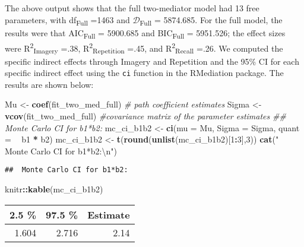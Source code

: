 \documentclass[11pt,]{article}
\newenvironment{Shaded}{\begin{snugshade}}{\end{snugshade}}
\newcommand{\CharTok}[1]{\textcolor[rgb]{0.31,0.60,0.02}{#1}}
\newcommand{\CommentTok}[1]{\textcolor[rgb]{0.56,0.35,0.01}{\textit{#1}}}
\newcommand{\DataTypeTok}[1]{\textcolor[rgb]{0.13,0.29,0.53}{#1}}
\newcommand{\DecValTok}[1]{\textcolor[rgb]{0.00,0.00,0.81}{#1}}
\newcommand{\KeywordTok}[1]{\textcolor[rgb]{0.13,0.29,0.53}{\textbf{#1}}}
\newcommand{\NormalTok}[1]{#1}
\newcommand{\OperatorTok}[1]{\textcolor[rgb]{0.81,0.36,0.00}{\textbf{#1}}}
\newcommand{\StringTok}[1]{\textcolor[rgb]{0.31,0.60,0.02}{#1}}
\begin{document}
The above output shows that the full two-mediator model had 13 free
parameters, with df\textsubscript{Full} =1463 and
\(\mathcal{D}\)\textsubscript{Full} = 5874.685. For the full model, the
results were that AIC\textsubscript{Full} = 5900.685 and
BIC\textsubscript{Full} = 5951.526; the effect sizes were
R\textsuperscript{2}\textsubscript{Imagery} =.38,
R\textsuperscript{2}\textsubscript{Repetition} =.45, and
R\textsuperscript{2}\textsubscript{Recall} =.26. We computed the
specific indirect effects through Imagery and Repetition and the 95\% CI
for each specific indirect effect using the \texttt{ci} function in the
RMediation package. The results are shown below:

\begin{Shaded}
\begin{Highlighting}[]
\NormalTok{Mu <-}\StringTok{ }\KeywordTok{coef}\NormalTok{(fit_two_med_full) }\CommentTok{# path coefficient estimates}
\NormalTok{Sigma <-}
\StringTok{  }\KeywordTok{vcov}\NormalTok{(fit_two_med_full) }\CommentTok{#covariance matrix of the parameter estimates}
\CommentTok{## Monte Carlo CI for b1*b2:}
\NormalTok{mc_ci_b1b2 <-}\StringTok{ }\KeywordTok{ci}\NormalTok{(}\DataTypeTok{mu =}\NormalTok{ Mu,}
             \DataTypeTok{Sigma =}\NormalTok{ Sigma,}
             \DataTypeTok{quant =} \OperatorTok{~}\StringTok{ }\NormalTok{b1 }\OperatorTok{*}\StringTok{ }\NormalTok{b2)}
\NormalTok{mc_ci_b1b2 <-}\StringTok{ }\KeywordTok{t}\NormalTok{(}\KeywordTok{round}\NormalTok{(}\KeywordTok{unlist}\NormalTok{(mc_ci_b1b2)[}\DecValTok{1}\OperatorTok{:}\DecValTok{3}\NormalTok{],}\DecValTok{3}\NormalTok{))}
\KeywordTok{cat}\NormalTok{(}\StringTok{" Monte Carlo CI for b1*b2:}\CharTok{\textbackslash{}n}\StringTok{"}\NormalTok{)}
\end{Highlighting}
\end{Shaded}

\begin{verbatim}
##  Monte Carlo CI for b1*b2:
\end{verbatim}

\begin{Shaded}
\begin{Highlighting}[]
\NormalTok{knitr}\OperatorTok{::}\KeywordTok{kable}\NormalTok{(mc_ci_b1b2)}
\end{Highlighting}
\end{Shaded}

\begin{longtable}[]{@{}rrr@{}}
\toprule
2.5 \% & 97.5 \% & Estimate\tabularnewline
\midrule
\endhead
1.604 & 2.716 & 2.14\tabularnewline
\bottomrule
\end{longtable}
\end{document}
